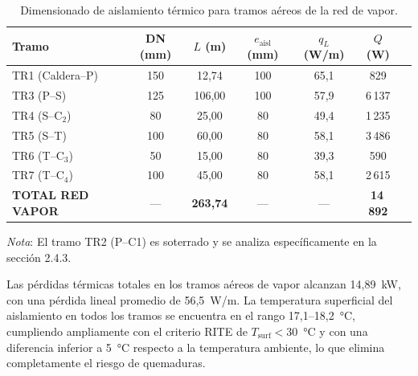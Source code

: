 \documentclass[12pt]{article}
\begin{document}
\begin{table}[htbp]
	\centering
	\caption{Dimensionado de aislamiento térmico para tramos aéreos de la red de vapor.}
	\label{tab:aislamiento_vapor_aereo}
	\begin{tabular}{lcccccc}
		\toprule
		\textbf{Tramo}           & \textbf{DN (mm)} & \textbf{$L$ (m)}  & \textbf{$e_{\text{aisl}}$ (mm)} & \textbf{$q_L$ (W/m)} & \textbf{$Q$ (W)} \\
		\midrule
		TR1 (Caldera--P)         & 150              & 12{,}74           & 100                             & 65{,}1               & 829              \\
		TR3 (P--S)               & 125              & 106{,}00          & 100                             & 57{,}9               & 6\,137           \\
		TR4 (S--C$_2$)           & 80               & 25{,}00           & 80                              & 49{,}4               & 1\,235           \\
		TR5 (S--T)               & 100              & 60{,}00           & 80                              & 58{,}1               & 3\,486           \\
		TR6 (T--C$_3$)           & 50               & 15{,}00           & 80                              & 39{,}3               & 590              \\
		TR7 (T--C$_4$)           & 100              & 45{,}00           & 80                              & 58{,}1               & 2\,615           \\
		\midrule
		\textbf{TOTAL RED VAPOR} & ---              & \textbf{263{,}74} & ---                             & ---                  & \textbf{14\,892} \\
		\bottomrule
	\end{tabular}
	\vspace{0.3cm}

	\noindent \small \textit{Nota}: El tramo TR2 (P--C1) es soterrado y se analiza específicamente en la sección 2.4.3.
\end{table}

Las pérdidas térmicas totales en los tramos aéreos de vapor alcanzan 14{,}89~kW, con una pérdida lineal promedio de 56{,}5~W/m. La temperatura superficial del aislamiento en todos los tramos se encuentra en el rango 17{,}1--18{,}2~°C, cumpliendo ampliamente con el criterio RITE de $T_{\text{surf}} < 30$~°C y con una diferencia inferior a 5~°C respecto a la temperatura ambiente, lo que elimina completamente el riesgo de quemaduras.
\end{document}
